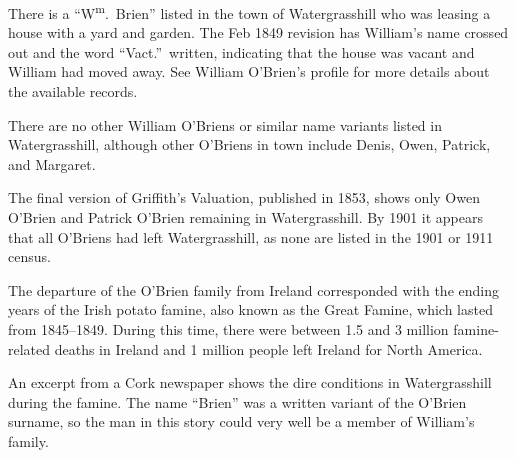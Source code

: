 There is a ``W\textsuperscript{m}.\ Brien'' listed in the town of Watergrasshill who was leasing a house with a yard and garden.\cite{Valuation1849:1} The Feb 1849 revision has William's name crossed out and the word ``Vact.''\ written, indicating that the house was vacant and William had moved away.\cite{House1849} See William O'Brien's profile for more details about the available records.

There are no other William O'Briens or similar name variants listed in Watergrasshill, although other O'Briens in town include Denis, Owen, Patrick, and Margaret.\cite{Valuation1849:2}

The final version of Griffith's Valuation, published in 1853, shows only Owen O'Bri\-en and Patrick O'Bri\-en remaining in Watergrasshill.\cite{Griffiths:46} By 1901 it appears that all O'Bri\-ens had left Watergrasshill, as none are listed in the 1901 or 1911 census.\cite{1901IrishCensus}

The departure of the O'Brien family from Ireland corresponded with the ending years of the Irish potato famine, also known as the Great Famine, which lasted from 1845--1849. During this time, there were between 1.5 and 3 million famine-related deaths in Ireland and 1 million people left Ireland for North America.\cite{Smith:469}

An excerpt from a Cork newspaper shows the dire conditions in Watergrasshill during the famine. The name ``Brien'' was a written variant of the O'Brien surname,\cite{TimelineReport} so the man in this story could very well be a member of William's family.

